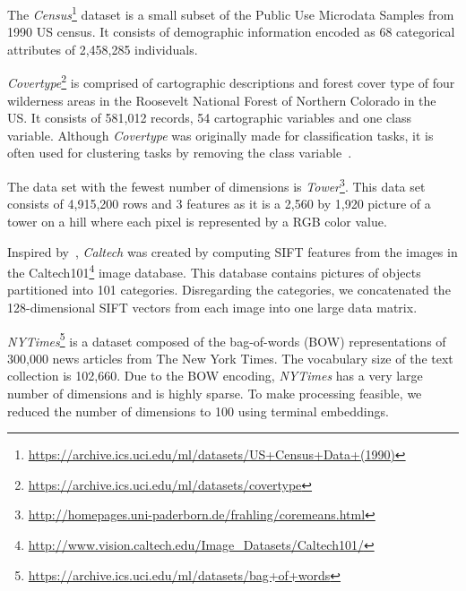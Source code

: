 The \textit{Census}\footnote{\url{https://archive.ics.uci.edu/ml/datasets/US+Census+Data+(1990)}} dataset is a small subset of the Public Use Microdata Samples from 1990 US census. It consists of demographic information encoded as 68 categorical attributes of 2,458,285 individuals. 

\textit{Covertype}\footnote{\url{https://archive.ics.uci.edu/ml/datasets/covertype}} is comprised of cartographic descriptions and forest cover type of four wilderness areas in the Roosevelt National Forest of Northern Colorado in the US. It consists of 581,012 records, 54 cartographic variables and one class variable. Although \textit{Covertype} was originally made for classification tasks, it is often used for clustering tasks by removing the class variable~\cite{AckermannMRSLS12}.

The data set with the fewest number of dimensions is \textit{Tower}\footnote{\url{http://homepages.uni-paderborn.de/frahling/coremeans.html}}. This data set consists of 4,915,200 rows and 3 features as it is a 2,560 by 1,920 picture of a tower on a hill where each pixel is represented by a RGB color value. 



Inspired by~\cite{FGSSS13}, \textit{Caltech} was created by computing SIFT features from the images in the Caltech101\footnote{\url{http://www.vision.caltech.edu/Image_Datasets/Caltech101/}} image database. This database contains pictures of objects partitioned into 101 categories. Disregarding the categories, we concatenated the 128-dimensional SIFT vectors from each image into one large data matrix. 

\textit{NYTimes}\footnote{\url{https://archive.ics.uci.edu/ml/datasets/bag+of+words}} is a dataset composed of the bag-of-words (BOW) representations of 300,000 news articles from The New York Times. The vocabulary size of the text collection is 102,660. Due to the BOW encoding, \textit{NYTimes} has a very large number of dimensions and is highly sparse. To make processing feasible, we reduced the number of dimensions to 100 using terminal embeddings.

